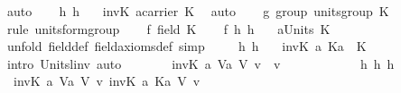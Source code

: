 \begin{isabellebody}
\ auto\isanewline
\ \ \isamarkupfalse%
\ h{}\ h{}\ \isamarkupfalse%
\ {}{\isacharcolon}\ {\isachardoublequoteopen}inv\isactrlbsub K\isactrlesub \ a{\isasymin}carrier\ K{\isachardoublequoteclose}\ \isamarkupfalse%
\ auto\isanewline
\ \ \isamarkupfalse%
\ g{\isacharcolon}\ group\ {\isachardoublequoteopen}{\isacharparenleft}units{\isacharunderscore}group\ K{\isacharparenright}{\isachardoublequoteclose}\ \isamarkupfalse%
\ {\isacharparenleft}rule\ units{\isacharunderscore}form{\isacharunderscore}group{\isacharparenright}\isanewline
\ \ \isamarkupfalse%
\ f{\isacharcolon}\ {\isachardoublequoteopen}field\ K{\isachardoublequoteclose}\isacommand{{\isachardot}{\isachardot}}\isamarkupfalse%
\isanewline
\ \ \isamarkupfalse%
\ f\ h{}\ h{}\ \isamarkupfalse%
\ {}{\isacharcolon}\ {\isachardoublequoteopen}a{\isasymin}Units\ K{\isachardoublequoteclose}\ \isanewline
\ \ \ \ \isamarkupfalse%
\ {\isacharparenleft}unfold\ field{\isacharunderscore}def\ field{\isacharunderscore}axioms{\isacharunderscore}def{\isacharcomma}\ simp{\isacharparenright}\isanewline
\ \ \isamarkupfalse%
\ {}\ h{}\ h{}\ \isamarkupfalse%
\ {}{\isacharcolon}\ {\isachardoublequoteopen}{\isacharparenleft}{\isacharparenleft}inv\isactrlbsub K\isactrlesub \ a{\isacharparenright}\ {\isasymotimes}\isactrlbsub K\isactrlesub a{\isacharparenright}\ {\isacharequal}\ {\isasymone}\isactrlbsub K\isactrlesub {\isachardoublequoteclose}\ \isanewline
\ \ \ \ \isamarkupfalse%
\ {\isacharparenleft}intro\ Units{\isacharunderscore}l{\isacharunderscore}inv{\isacharcomma}\ auto{\isacharparenright}\isanewline
\ \ \isamarkupfalse%
\ {}\ \isamarkupfalse%
\ {}{\isacharcolon}\ {\isachardoublequoteopen}{\isacharparenleft}inv\isactrlbsub K\isactrlesub \ a\ {\isacharparenright}{\isasymodot}\isactrlbsub V\isactrlesub {\isacharparenleft}a\ {\isasymodot}\isactrlbsub V\isactrlesub \ v{\isacharparenright}\ {\isacharequal}\ v{\isachardoublequoteclose}\ \isanewline
\ \ \isamarkupfalse%
\ {\isacharminus}\ \isanewline
\ \ \ \ \isamarkupfalse%
\ h{}\ h{}\ h{}\ \isamarkupfalse%
\ {}{\isacharcolon}\ {\isachardoublequoteopen}{\isacharparenleft}inv\isactrlbsub K\isactrlesub \ a\ {\isacharparenright}{\isasymodot}\isactrlbsub V\isactrlesub {\isacharparenleft}a\ {\isasymodot}\isactrlbsub V\isactrlesub \ v{\isacharparenright}\ {\isacharequal}{\isacharparenleft}inv\isactrlbsub K\isactrlesub \ a\ {\isasymotimes}\isactrlbsub K\isactrlesub a{\isacharparenright}\ {\isasymodot}\isactrlbsub V\isactrlesub \ v{\isachardoublequoteclose}\ \isamarkupfalse%

\end{isabellebody}
